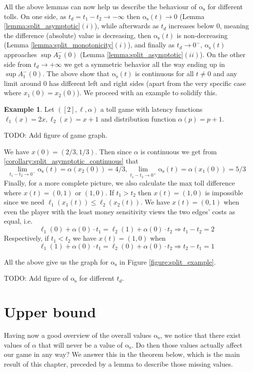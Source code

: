 \documentclass[10pt,a4paper]{book}
\newcommand{\as}{\mathrm{\alpha_s}}
\theoremstyle{definition}
\theoremstyle{comment}
\newtheorem{example}[definition]{Example}
\begin{document}
All the above lemmas can now help us describe the behaviour of $\as$ for different tolls.
On one side, as $t_d = t_1 - t_2 \rightarrow -\infty$ then $\as(t) \rightarrow 0$ (Lemma \ref{lemma:split_asymptotic}$(i)$), while afterwards as $t_d$ increases below $0$, meaning the difference (absolute) value is decreasing, then $\as(t)$ is non-decreasing (Lemma \ref{lemma:split_monotonicity}$(i)$), and finally as $t_d \rightarrow 0^-$, $\as(t)$ approaches $\sup A_2^-(0)$ (Lemma \ref{lemma:split_asymptotic}$(ii)$).
On the other side from $t_d \rightarrow +\infty$ we get a symmetric behavior all the way ending up in $\sup A_1^-(0)$.
The above show that $\as(t)$ is continuous for all $t \ne 0$ and any limit around $0$ has different left and right sides (apart from the very specific case where $x_1(0) = x_2(0)$).
We proceed with an example to solidify this.

\begin{example}
	\label{example:simple_alpha}
	Let $([2], \ell, \alpha)$ a toll game with latency functions $\ell_1(x) = 2x, \ell_2(x) = x + 1$ and distribution function $\alpha(p) = p + 1$.
\end{example}
TODO: Add figure of game graph.

We have $x(0) = (2/3, 1/3)$.
Then since $\alpha$ is continuous we get from \ref{corollary:split_asymptotic_continuous} that
\[\lim_{t_1 - t_2 \rightarrow 0^-} \as(t) = \alpha(x_2(0)) = 4/3, \lim_{t_1 - t_2 \rightarrow 0^+} \as(t) = \alpha(x_1(0)) = 5/3\]
Finally, for a more complete picture, we also calculate the max toll difference where $x(t) = (0, 1)$ or $(1, 0)$.
If $t_1 > t_2$ then $x(t) = (1, 0)$ is impossible since we need $\ell_1(x_1(t)) \le \ell_2(x_2(t))$.
We have $x(t) = (0, 1)$ when even the player with the least money sensitivity views the two edges' costs as equal, i.e.
\[
	\ell_1(0) + \alpha(0) \cdot t_1 = \ell_2(1) + \alpha(0) \cdot t_2 \Rightarrow t_1 - t_2 = 2
\]
Respectively, if $t_1 < t_2$ we have $x(t) = (1, 0)$ when
\[
	\ell_1(1) + \alpha(0) \cdot t_1 = \ell_2(0) + \alpha(0) \cdot t_2 \Rightarrow t_2 - t_1 = 1
\]

All the above give us the graph for $\as$ in Figure \ref{figure:split_example}.

TODO: Add figure of $\as$ for different $t_d$.

\section{Upper bound}

Having now a good overview of the overall values $\as$, we notice that there exist values of $\alpha$ that will never be a value of $\as$.
Do then those values actually affect our game in any way?
We answer this in the theorem below, which is the main result of this chapter, preceded by a lemma to describe those missing values.
\end{document}
